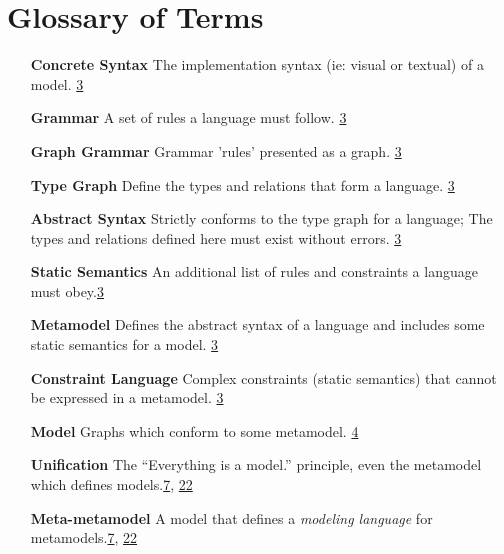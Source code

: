 \section{Glossary of Terms}
\vspace{0.5cm}

\begin{itemize}

\item[\bf Concrete Syntax]
The implementation syntax (ie: visual or textual) of a model. \hfill \hyperlink{page.3}{3} 

\item[\bf Grammar] 
A set of rules a language must follow. \hfill \hyperlink{page.3}{3} 

\item[\bf Graph Grammar] 
Grammar 'rules' presented as a graph. \hfill \hyperlink{page.3}{3}

\item[\bf Type Graph] 
Define the types and relations that form a language. \hfill \hyperlink{page.3}{3}

\item[\bf Abstract Syntax] 
Strictly conforms to the type graph for a language; The types and relations defined here must exist without errors. \hfill \hyperlink{page.3}{3}

\item[\bf Static Semantics] 
An additional list of rules and constraints a language must obey.\hfill \hyperlink{page.3}{3}

\item[\bf Metamodel] 
Defines the abstract syntax of a language and includes some static semantics for a model. \hfill \hyperlink{page.3}{3}

\item[\bf Constraint Language] 
Complex constraints (static semantics) that cannot be expressed in a metamodel. \hfill \hyperlink{page.3}{3}

\item[\bf Model] 
Graphs which conform to some metamodel. \hfill \hyperlink{page.4}{4}

\item[\bf Unification]  
The ``Everything is a model.'' principle, even the metamodel which defines models.\hfill \hyperlink{page.7}{7}, \hyperlink{page.22}{22}

\item[\bf Meta-metamodel] 
A model that defines a \emph{modeling language} for metamodels.\hfill \hyperlink{page.7}{7}, \hyperlink{page.22}{22}


\end{itemize}
